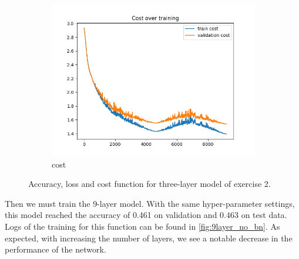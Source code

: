 \documentclass[a4paper]{article}
\begin{document}
\begin{figure}[h]
\begin{subfigure}{0.3\textwidth}
		\includegraphics[width=\linewidth]{images/ex2_no_batch_cost.png}
		\caption{cost}
	\end{subfigure}
	\caption{Accuracy, loss and cost function for three-layer model of exercise 2.}
	\label{fig:3layer_no_bn}
\end{figure}

Then we must train the 9-layer model. With the same hyper-parameter settings, this model reached the accuracy of 0.461 on validation and 0.463 on test data. Logs of the training for this function can be found in \autoref{fig:9layer_no_bn}. As expected, with increasing the number of layers, we see a notable decrease in the performance of the network.
\end{document}
